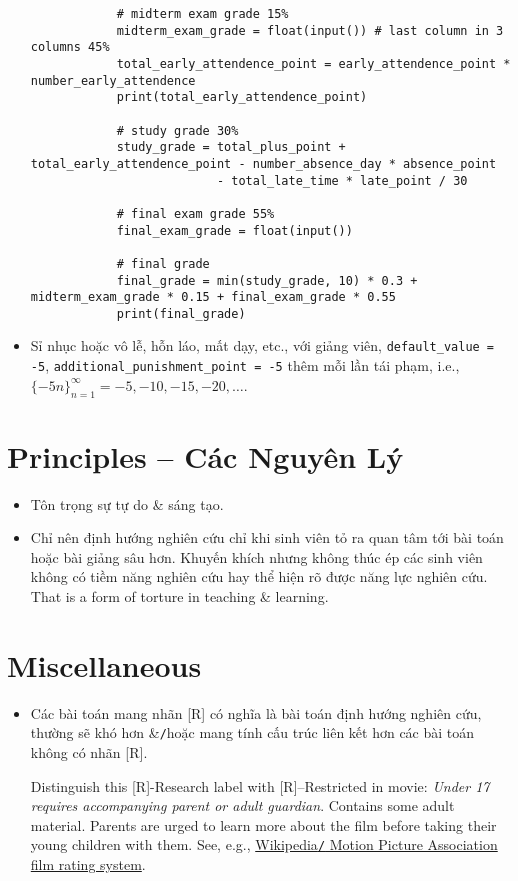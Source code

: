 \documentclass{article}
\begin{document}
\begin{itemize}
\begin{verbatim}
		    # midterm exam grade 15%
		    midterm_exam_grade = float(input()) # last column in 3 columns 45%
		    total_early_attendence_point = early_attendence_point * number_early_attendence
		    print(total_early_attendence_point)
		
		    # study grade 30%
		    study_grade = total_plus_point + total_early_attendence_point - number_absence_day * absence_point
		                  - total_late_time * late_point / 30
		
		    # final exam grade 55%
		    final_exam_grade = float(input())
		
		    # final grade
		    final_grade = min(study_grade, 10) * 0.3 + midterm_exam_grade * 0.15 + final_exam_grade * 0.55
		    print(final_grade)
	\end{verbatim}
	\item Sỉ nhục hoặc vô lễ, hỗn láo, mất dạy, etc., với giảng viên, \verb|default_value = -5|, \verb|additional_punishment_point = -5| thêm mỗi lần tái phạm, i.e., $\{-5n\}_{n=1}^\infty = -5,-10,-15,-20,\ldots$.
\end{itemize}


\section{Principles -- Các Nguyên Lý}

\begin{itemize}
	\item Tôn trọng sự tự do \& sáng tạo.
	\item Chỉ nên định hướng nghiên cứu chỉ khi sinh viên tỏ ra quan tâm tới bài toán hoặc bài giảng sâu hơn. Khuyến khích nhưng không thúc ép các sinh viên không có tiềm năng nghiên cứu hay thể hiện rõ được năng lực nghiên cứu. That is a form of torture in teaching \& learning.
\end{itemize}


\section{Miscellaneous}

\begin{itemize}
	\item Các bài toán mang nhãn [R] có nghĩa là bài toán định hướng nghiên cứu, thường sẽ khó hơn \&{\tt/}hoặc mang tính cấu trúc liên kết hơn các bài toán không có nhãn [R].
	
	Distinguish this [R]-Research label with [R]--Restricted in movie: {\it Under 17 requires accompanying parent or adult guardian}. Contains some adult material. Parents are urged to learn more about the film before taking their young children with them. See, e.g., \href{https://en.wikipedia.org/wiki/Motion_Picture_Association_film_rating_system}{Wikipedia{\tt/} Motion Picture Association film rating system}.
\end{itemize}


\printbibliography[heading=bibintoc]
	
\end{document}

